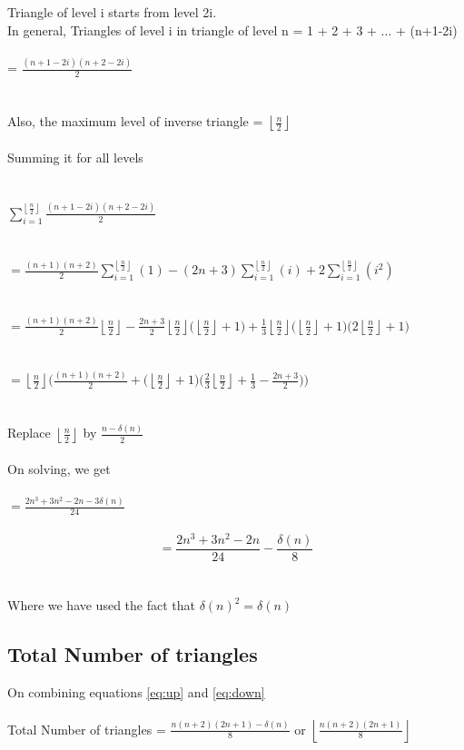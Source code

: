 \documentclass[12pt]{article}
\begin{document}
 Triangle of level i starts from level 2i. \\
 In general,
 Triangles of level i in triangle of level n = 1 + 2 + 3 + ... + (n+1-2i)\\ \\ = $\displaystyle\frac{(n+1-2i)(n+2-2i)}{2}$ \\
 \\ \\
 Also, the maximum level of inverse triangle = $\displaystyle \left \lfloor {\frac{n}{2}}\right \rfloor $
 \\ \\
 Summing it for all levels
 \\ \\ \\
 $\displaystyle\sum_{i=1}^{ \left \lfloor {\frac{n}{2}}\right \rfloor } \frac{(n+1-2i)(n+2-2i)}{2}$ 
 \\ \\ \\
 $\displaystyle= \frac{(n+1)(n+2)}{2} \displaystyle\sum_{i=1}^{\left \lfloor {\frac{n}{2}}\right \rfloor} (1) - (2n+3) \displaystyle\sum_{i=1}^{\left \lfloor {\frac{n}{2}}\right \rfloor} (i) + 2 \displaystyle\sum_{i=1}^{\left \lfloor {\frac{n}{2}}\right \rfloor} (i^{2})$
 \\ \\ \\
 $\displaystyle= \frac{(n+1)(n+2)}{2} \left \lfloor {\frac{n}{2}}\right \rfloor - \frac{2n+3}{2} \left \lfloor {\frac{n}{2}}\right \rfloor \bigg(\left \lfloor {\frac{n}{2}}\right \rfloor + 1 \bigg) + \frac{1}{3} \left \lfloor {\frac{n}{2}}\right \rfloor \bigg(\left \lfloor {\frac{n}{2}}\right \rfloor + 1 \bigg)\bigg(2\left \lfloor {\frac{n}{2}}\right \rfloor+1\bigg) $
 \\ \\ \\
 $\displaystyle= \left \lfloor {\frac{n}{2}}\right \rfloor \Bigg( \frac{(n+1)(n+2)}{2} + \bigg(\left \lfloor {\frac{n}{2}}\right \rfloor + 1 \bigg)\bigg(\frac{2}{3}\left \lfloor {\frac{n}{2}}\right \rfloor+\frac{1}{3} - \frac{2n+3}{2}\bigg)\Bigg)$
 \\ \\ \\
 Replace $\displaystyle\left \lfloor {\frac{n}{2}}\right \rfloor$ by $\displaystyle\frac{n-\delta(n)}{2}$
 \\ \\ 
 On solving, we get
 \\ \\
 $\displaystyle= \frac{2n^{3}+3n^{2}-2n-3\delta(n)}{24}$
 \\ \\
 \begin{equation}\label{eq:down}
  = \frac{2n^{3}+3n^{2}-2n}{24}-\frac{\delta(n)}{8}
 \end{equation}
 \\ \\
 Where we have used the fact that $\delta(n)^{2}=\delta(n)$
 
 \subsection{\color{blue} Total Number of triangles}
 On combining equations \ref{eq:up} and \ref{eq:down} 
 \\ \\
 Total Number of triangles = $\displaystyle\frac{n(n+2)(2n+1)-\delta(n)}{8}$ or $\displaystyle\left \lfloor {\frac{n(n+2)(2n+1)}{8}}\right \rfloor$
 
\end{document}
